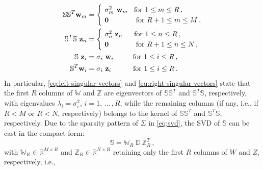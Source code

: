 \documentclass[12pt, a4paper, twoside, openright, notitlepage]{report}
\numberwithin{equation}{chapter}
\theoremstyle{theorem}
\theoremstyle{definition}
\theoremstyle{remark}
\theoremstyle{proposition}
\numberwithin{figure}{chapter}
\begin{document}
		\begin{align}
			\label{eq:left-singular-vectors}
			\mathbb{S} \mathbb{S}^T \mathbf{w}_m & = 
			\begin{cases}
				& \hspace*{-0.3cm} \sigma_m^2 ~ \mathbf{w}_m \hspace*{0.3cm} \text{for $1 \leq m \leq R$} \, , \\
				& \hspace*{-0.3cm} \mathbf{0} \hspace*{1.34cm} \text{for $R+1 \leq m \leq M$} \, ,
			\end{cases} \\
			\label{eq:right-singular-vectors}
			\mathbb{S}^T \mathbb{S} ~ \mathbf{z}_n & =
			\begin{cases}
				& \hspace*{-0.3cm} \sigma_n^2 ~ \mathbf{z}_n \hspace*{0.57cm} \text{for $1 \leq n \leq R$} \, , \\
				& \hspace*{-0.3cm} \mathbf{0} \hspace*{1.34cm} \text{for $R+1 \leq n \leq N$} \, ,
			\end{cases} \\
			\label{eq:snapshot-method}
			\mathbb{S} ~ \mathbf{z}_i & = \sigma_i ~ \mathbf{w}_i \hspace*{0.95cm} \text{for $1 \leq i \leq R$} \, , \\
			\mathbb{S}^T \mathbf{w}_i & = \sigma_i ~ \mathbf{z}_i \hspace*{1.07cm} \text{for $1 \leq i \leq R$} \, .
		\end{align}
		In particular, \eqref{eq:left-singular-vectors} and \eqref{eq:right-singular-vectors} state that the first $R$ columns of $\mathbb{W}$ and $\mathbb{Z}$ are eigenvectors of $\mathbb{S} \mathbb{S}^T$ and $\mathbb{S}^T \mathbb{S}$, respectively, with eigenvalues $\lambda_i = \sigma_i^2$, $i = 1, \, \ldots \, , R$, while the remaining columns (if any, i.e., if $R < M$ or $R < N$, respectively) belongs to the kernel of $\mathbb{S} \mathbb{S}^T$ and $\mathbb{S}^T \mathbb{S}$, respectively. Due to the sparsity pattern of $\Sigma$ in \eqref{eq:svd}, the SVD of $\mathbb{S}$ can be cast in the compact form:
		\begin{equation*}
			\label{eq:svd-compact}
			\mathbb{S} = \mathbb{W}_R ~ \mathbb{D} ~ \mathbb{Z}_R^T \, ,
		\end{equation*}
		with $\mathbb{W}_R \in \mathbb{R}^{M \times R}$ and $\mathbb{Z}_R \in \mathbb{R}^{N \times R}$ retaining only the first $R$ columns of $W$ and $Z$, respectively, i.e.,
\end{document}
